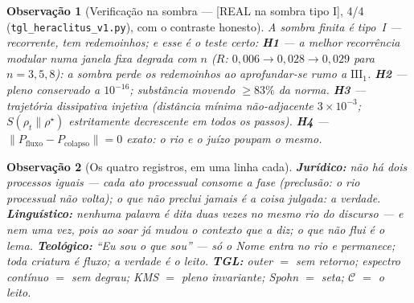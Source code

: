 \documentclass[11pt,a4paper]{article}
\newcommand{\SOMBRA}{\textsf{[REAL na sombra tipo I]}}
\newtheorem{remark}{Observação}
\begin{document}
\begin{remark}[Verificação na sombra --- \SOMBRA, 4/4
(\texttt{tgl\_heraclitus\_v1.py}), com o contraste honesto]
A sombra finita é tipo~I --- \emph{recorrente}, tem redemoinhos; e esse
é o teste certo: \textbf{H1} --- a melhor recorrência modular numa
janela fixa \emph{degrada} com $n$ ($R$: $0{,}006\to0{,}028\to0{,}029$
para $n=3,5,8$): a sombra perde os redemoinhos ao aprofundar-se rumo a
$\mathrm{III}_1$. \textbf{H2} --- pleno conservado a $10^{-16}$;
substância movendo $\geq83\%$ da norma. \textbf{H3} --- trajetória
dissipativa injetiva (distância mínima não-adjacente $3\times10^{-3}$;
$S(\rho_t\|\rho^\star)$ estritamente decrescente em todos os passos).
\textbf{H4} --- $\|P_{\mathrm{fluxo}}-P_{\mathrm{colapso}}\|=0$ exato:
o rio e o juízo poupam o mesmo.
\end{remark}

\begin{remark}[Os quatro registros, em uma linha cada]
\textbf{Jurídico:} não há dois processos iguais --- cada ato processual
consome a fase (preclusão: o rio processual não volta); o que não
preclui jamais é a coisa julgada: a verdade. \textbf{Linguístico:}
nenhuma palavra é dita duas vezes no mesmo rio do discurso --- e nem uma
vez, pois ao soar já mudou o contexto que a diz; o que não flui é o
lema. \textbf{Teológico:} ``Eu sou o que sou'' --- só o Nome entra no
rio e permanece; toda criatura é fluxo; a verdade é o leito.
\textbf{TGL:} outer $=$ sem retorno; espectro contínuo $=$ sem degrau;
KMS $=$ pleno invariante; Spohn $=$ seta; $\mathcal C$ $=$ o leito.
\end{remark}

\end{document}
